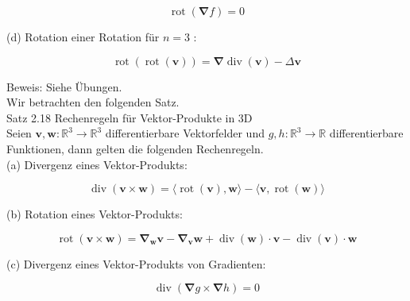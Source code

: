 \documentclass[10pt]{article}
\begin{document}
$$
\operatorname{rot}(\boldsymbol{\nabla} f)=0
$$

(d) Rotation einer Rotation für $n=3$ :

$$
\operatorname{rot}(\operatorname{rot}(\mathbf{v}))=\boldsymbol{\nabla} \operatorname{div}(\mathbf{v})-\Delta \mathbf{v}
$$

Beweis: Siehe Übungen.\\
Wir betrachten den folgenden Satz.\\
Satz 2.18 Rechenregeln für Vektor-Produkte in 3D\\
Seien $\mathbf{v}, \mathbf{w}: \mathbb{R}^{3} \rightarrow \mathbb{R}^{3}$ differentierbare Vektorfelder und $g, h: \mathbb{R}^{3} \rightarrow \mathbb{R}$ differentierbare Funktionen, dann gelten die folgenden Rechenregeln.\\
(a) Divergenz eines Vektor-Produkts:

$$
\operatorname{div}(\mathbf{v} \times \mathbf{w})=\langle\operatorname{rot}(\mathbf{v}), \mathbf{w}\rangle-\langle\mathbf{v}, \operatorname{rot}(\mathbf{w})\rangle
$$

(b) Rotation eines Vektor-Produkts:

$$
\operatorname{rot}(\mathbf{v} \times \mathbf{w})=\boldsymbol{\nabla}_{\mathbf{w}} \mathbf{v}-\boldsymbol{\nabla}_{\mathbf{v}} \mathbf{w}+\operatorname{div}(\mathbf{w}) \cdot \mathbf{v}-\operatorname{div}(\mathbf{v}) \cdot \mathbf{w}
$$

(c) Divergenz eines Vektor-Produkts von Gradienten:

$$
\operatorname{div}(\boldsymbol{\nabla} g \times \boldsymbol{\nabla} h)=0
$$
\end{document}
